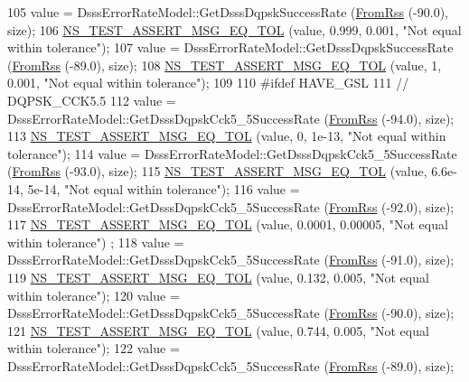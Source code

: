 \begin{DoxyCode}
105   value = DsssErrorRateModel::GetDsssDqpskSuccessRate (\hyperlink{wifi-error-rate-models-test_8cc_a04e29db50fb1c1d787cf553ee9453e90}{FromRss} (-90.0), size);
106   \hyperlink{group__testing_ga9e7861b56b4e70db3b56044cb7a28e41}{NS\_TEST\_ASSERT\_MSG\_EQ\_TOL} (value, 0.999, 0.001, \textcolor{stringliteral}{"Not equal within tolerance"});
107   value = DsssErrorRateModel::GetDsssDqpskSuccessRate (\hyperlink{wifi-error-rate-models-test_8cc_a04e29db50fb1c1d787cf553ee9453e90}{FromRss} (-89.0), size);
108   \hyperlink{group__testing_ga9e7861b56b4e70db3b56044cb7a28e41}{NS\_TEST\_ASSERT\_MSG\_EQ\_TOL} (value, 1, 0.001, \textcolor{stringliteral}{"Not equal within tolerance"});
109 
110 \textcolor{preprocessor}{#ifdef HAVE\_GSL}
111   \textcolor{comment}{// DQPSK\_CCK5.5}
112   value = DsssErrorRateModel::GetDsssDqpskCck5\_5SuccessRate (\hyperlink{wifi-error-rate-models-test_8cc_a04e29db50fb1c1d787cf553ee9453e90}{FromRss} (-94.0), size);
113   \hyperlink{group__testing_ga9e7861b56b4e70db3b56044cb7a28e41}{NS\_TEST\_ASSERT\_MSG\_EQ\_TOL} (value, 0, 1e-13, \textcolor{stringliteral}{"Not equal within tolerance"});
114   value = DsssErrorRateModel::GetDsssDqpskCck5\_5SuccessRate (\hyperlink{wifi-error-rate-models-test_8cc_a04e29db50fb1c1d787cf553ee9453e90}{FromRss} (-93.0), size);
115   \hyperlink{group__testing_ga9e7861b56b4e70db3b56044cb7a28e41}{NS\_TEST\_ASSERT\_MSG\_EQ\_TOL} (value, 6.6e-14, 5e-14, \textcolor{stringliteral}{"Not equal within tolerance"});
116   value = DsssErrorRateModel::GetDsssDqpskCck5\_5SuccessRate (\hyperlink{wifi-error-rate-models-test_8cc_a04e29db50fb1c1d787cf553ee9453e90}{FromRss} (-92.0), size);
117   \hyperlink{group__testing_ga9e7861b56b4e70db3b56044cb7a28e41}{NS\_TEST\_ASSERT\_MSG\_EQ\_TOL} (value, 0.0001, 0.00005, \textcolor{stringliteral}{"Not equal within tolerance"})
      ;
118   value = DsssErrorRateModel::GetDsssDqpskCck5\_5SuccessRate (\hyperlink{wifi-error-rate-models-test_8cc_a04e29db50fb1c1d787cf553ee9453e90}{FromRss} (-91.0), size);
119   \hyperlink{group__testing_ga9e7861b56b4e70db3b56044cb7a28e41}{NS\_TEST\_ASSERT\_MSG\_EQ\_TOL} (value, 0.132, 0.005, \textcolor{stringliteral}{"Not equal within tolerance"});
120   value = DsssErrorRateModel::GetDsssDqpskCck5\_5SuccessRate (\hyperlink{wifi-error-rate-models-test_8cc_a04e29db50fb1c1d787cf553ee9453e90}{FromRss} (-90.0), size);
121   \hyperlink{group__testing_ga9e7861b56b4e70db3b56044cb7a28e41}{NS\_TEST\_ASSERT\_MSG\_EQ\_TOL} (value, 0.744, 0.005, \textcolor{stringliteral}{"Not equal within tolerance"});
122   value = DsssErrorRateModel::GetDsssDqpskCck5\_5SuccessRate (\hyperlink{wifi-error-rate-models-test_8cc_a04e29db50fb1c1d787cf553ee9453e90}{FromRss} (-89.0), size);

\end{DoxyCode}
